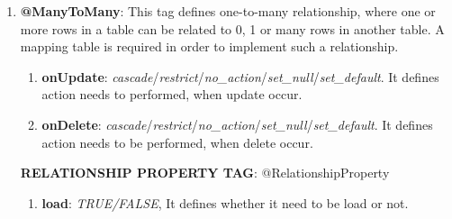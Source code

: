 \begin{enumerate}
\begin{enumerate}
		\end{enumerate}

	\item \small \textbf{@ManyToMany}: This tag defines one-to-many relationship, where one or more rows in a table can be related to 0, 1 or many rows in another table. A mapping table is required in order to implement such a relationship.

		\begin{enumerate}

			\item \small \textbf{onUpdate}: \textit{cascade}/\textit{restrict}/\textit{no\_action}/\textit{set\_null}/\textit{set\_default}. It defines action needs to performed, when update occur. 
			\item \small \textbf{onDelete}: \textit{cascade}/\textit{restrict}/\textit{no\_action}/\textit{set\_null}/\textit{set\_default}. It defines action needs to be performed, when delete occur.		

		\end{enumerate}

	\par
		\textbf{RELATIONSHIP PROPERTY TAG}: @RelationshipProperty

			\begin{enumerate}

				\item \small \textbf{load}: \textit{TRUE/FALSE}, It defines whether it need to be load or not.	

			\end{enumerate}


\end{enumerate}
